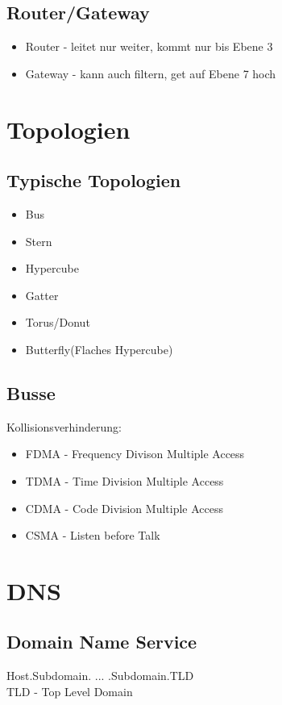 \documentclass[10pt,a4paper]{article}
\begin{document}
	\subsection{Router/Gateway}
		\begin{itemize}
			\item Router - leitet nur weiter, kommt nur bis Ebene 3
			\item Gateway - kann auch filtern, get auf Ebene 7 hoch
		\end{itemize}
	
	
\section{Topologien}
	\subsection{Typische Topologien}
		\begin{itemize}
			\item Bus
			\item Stern
			\item Hypercube
			\item Gatter
			\item Torus/Donut
			\item Butterfly(Flaches Hypercube)
		\end{itemize}
	\subsection{Busse}
		Kollisionsverhinderung:
			\begin{itemize}
				\item FDMA - Frequency Divison Multiple Access
				\item TDMA - Time Division Multiple Access
				\item CDMA - Code Division Multiple Access
				\item CSMA - Listen before Talk
			\end{itemize}


\section{DNS}
	\subsection{Domain Name Service}
		Host.Subdomain. ... .Subdomain.TLD	\\
		TLD - Top Level Domain
		
\end{document}
